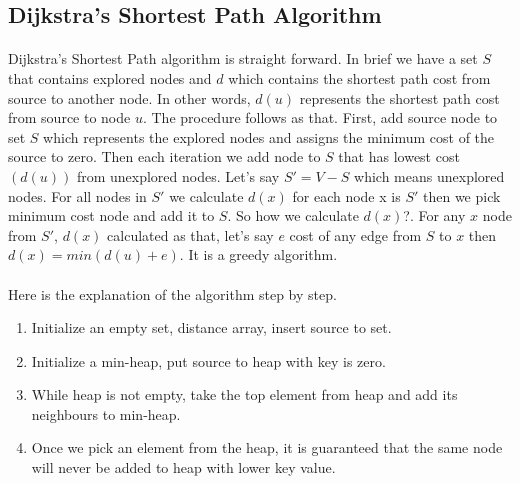 \documentclass[12pt]{article}
\begin{document}
 \subsection{Dijkstra's Shortest Path Algorithm}
 \paragraph{}  Dijkstra's Shortest Path algorithm is straight forward. In brief we have a set $S$ that contains explored nodes and $d$ which contains the shortest path cost from source to another node. In other words, $d(u)$ represents the shortest path cost from source to node $u$. The procedure follows as that.
 First, add source node to set $S$ which represents the explored nodes and assigns the minimum cost of the source to zero. Then each iteration we add node to $S$ that has lowest cost $(d(u))$ from unexplored nodes. Let's say $S' = V-S$ which means unexplored nodes. For all nodes in $S'$ we calculate $d(x)$ for each node x is $S'$ then we pick minimum cost node and add it to $S$. So how we calculate $d(x)$?. For any $x$ node from $S'$, $d(x)$ calculated as that, let's say $e$ cost of any edge from $S$ to $x$ then $d(x) = min(d(u)+e)$. It is a greedy algorithm.

\newpage
\paragraph{}
Here is the explanation of the algorithm step by step.  

\begin{enumerate}
    \item Initialize an empty set, distance array, insert source to set.
    \item Initialize a min-heap, put source to heap with key is zero.
    \item While heap is not empty, take the top element from heap and add its neighbours to min-heap.
    \item Once we pick an element from the heap, it is guaranteed that the same node will never be added to heap with lower key value. 
\end{enumerate}
\end{document}
